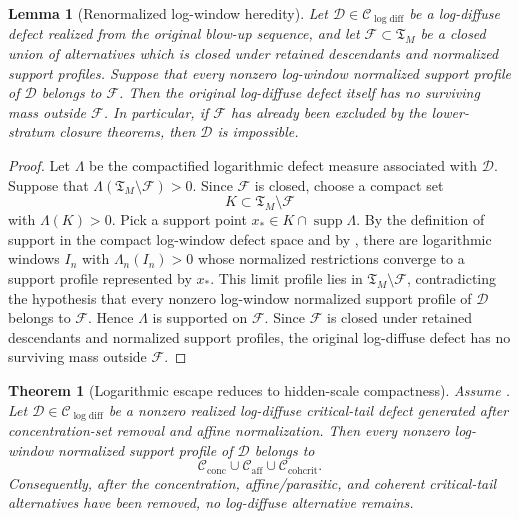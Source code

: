 \documentclass[11pt]{amsart}
\numberwithin{equation}{section}
\theoremstyle{plain}
\newtheorem{theorem}{Theorem}[section]
\newtheorem{lemma}[lemma]{Lemma}
\theoremstyle{definition}
\theoremstyle{remark}
\newcommand{\supp}{\operatorname{supp}}
\newcommand{\Cactive}{\mathcal C_{\mathrm{conc}}}
\newcommand{\Caff}{\mathcal C_{\mathrm{aff}}}
\newcommand{\Ccohcrit}{\mathcal C_{\mathrm{cohcrit}}}
\newcommand{\Tcrit}{\mathfrak T_M}
\newcommand{\Clogdiff}{\mathcal C_{\log\mathrm{diff}}}
\begin{document}
\begin{lemma}[Renormalized log-window heredity]
\label{lem:renormalized-log-window-heredity}
Let \(\mathcal D\in\Clogdiff\) be a log-diffuse defect realized from the original blow-up sequence, and
let \(\mathcal F\subset\Tcrit\) be a closed union of alternatives which is
closed under retained descendants and normalized support profiles.  Suppose that every nonzero
log-window normalized support profile of \(\mathcal D\) belongs to
\(\mathcal F\).  Then the
original log-diffuse defect itself has no surviving mass outside
\(\mathcal F\).  In particular, if \(\mathcal F\) has already been excluded
by the lower-stratum closure theorems, then \(\mathcal D\) is impossible.
\end{lemma}

\begin{proof}
Let \(\Lambda\) be the compactified logarithmic defect measure associated with
\(\mathcal D\).  Suppose that \(\Lambda(\Tcrit\setminus\mathcal F)>0\).  Since
\(\mathcal F\) is closed, choose a compact set
\[
   K\subset \Tcrit\setminus\mathcal F
\]
with \(\Lambda(K)>0\).  Pick a support point
\(x_*\in K\cap\supp\Lambda\).  By the definition of support in the compact
log-window defect space and by
, there are logarithmic windows \(I_n\)
with \(\Lambda_n(I_n)>0\) whose normalized restrictions converge to a support
profile represented by \(x_*\).  This limit profile lies in
\(\Tcrit\setminus\mathcal F\), contradicting the hypothesis that every nonzero
log-window normalized support profile of \(\mathcal D\) belongs to
\(\mathcal F\).  Hence \(\Lambda\) is supported on \(\mathcal F\).  Since
\(\mathcal F\) is closed under retained descendants and normalized support
profiles, the original log-diffuse defect has no surviving mass outside
\(\mathcal F\).
\end{proof}

\begin{theorem}[Logarithmic escape reduces to hidden-scale compactness]
\label{thm:log-diffuse-from-hidden-scale}
Assume .  Let
\(\mathcal D\in\Clogdiff\) be a nonzero realized log-diffuse critical-tail
defect generated after concentration-set removal and affine normalization.
Then every nonzero log-window normalized support profile of \(\mathcal D\)
belongs to
\[
   \Cactive\cup\Caff\cup\Ccohcrit .
\]
Consequently, after the concentration, affine/parasitic, and coherent critical-tail
alternatives have been removed, no log-diffuse alternative remains.
\end{theorem}
\end{document}

